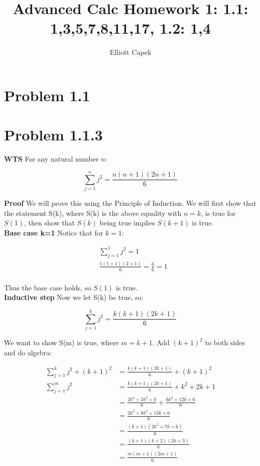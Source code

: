 \documentclass[10pt]{article} %
\title{Advanced Calc Homework \large 1: 1.1: 1,3,5,7,8,11,17, 1.2: 1,4}
\author{Elliott Capek}
\begin{document}
\maketitle{}

\section{Problem 1.1}

\section{Problem 1.1.3}
\textbf{WTS} For any natural number $n$:

\begin{equation*}
  \sum_{j=1}^{n} j^2 = \frac{n(n+1)(2n+1)}{6}
\end{equation*}

\textbf{Proof}
We will prove this using the Principle of Induction. We will first show that the statement S(k), where S(k) is the above equality with $n=k$, is true for $S(1)$, then show that $S(k)$ being true implies $S(k+1)$ is true.\\

\textbf{Base case k=1}
Notice that for $k=1$:

\begin{align*}
  &\sum_{j=1}^{1} j^2 = 1\\
  &\frac{1(1+1)(2+1)}{6} = \frac66 = 1\\
\end{align*}

Thus the base case holds, so $S(1)$ is true.\\

\textbf{Inductive step}
Now we let S(k) be true, so:

\begin{equation*}
  \sum_{j=1}^{k} j^2 = \frac{k(k+1)(2k+1)}{6}
\end{equation*}

We want to show S(m) is true, where $m=k+1$. Add $(k+1)^2$ to both sides and do algebra:

\begin{align*}
  \sum_{j=1}^{k} j^2 + (k+1)^2 &= \frac{k(k+1)(2k+1)}{6} + (k+1)^2\\
  \sum_{j=1}^{m} j^2 &= \frac{k(k+1)(2k+1)}{6} + k^2 + 2k + 1\\
  &= \frac{2k^3+3k^2+k}{6} + \frac{6k^2 + 12k + 6}{6}\\
  &= \frac{2k^3+8k^2+13k+6}{6}\\
  &= \frac{(k+1)(2k^2+7k+6)}{6}\\
  &= \frac{(k+1)(k+2)(2k+3)}{6}\\
  &= \frac{m(m+1)(2m+1)}{6}\\
\end{align*}
\end{document}

